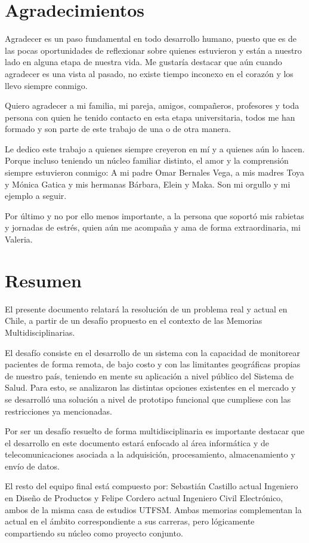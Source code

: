 \section*{Agradecimientos}

Agradecer es un paso fundamental en todo desarrollo humano, puesto que es de las pocas oportunidades de reflexionar sobre quienes estuvieron y están a nuestro lado en alguna etapa de nuestra vida. Me gustaría destacar que aún cuando agradecer es una vista al pasado, no existe tiempo inconexo en el corazón y los llevo siempre conmigo.

Quiero agradecer a mi familia, mi pareja, amigos, compañeros, profesores y toda persona con quien he tenido contacto en esta etapa universitaria, todos me han formado y son parte de este trabajo de una o de otra manera.

Le dedico este trabajo a quienes siempre creyeron en mí y a quienes aún lo hacen. Porque incluso teniendo un núcleo familiar distinto, el amor y la comprensión siempre estuvieron conmigo: A mi padre Omar Bernales Vega, a mis madres Toya y Mónica Gatica y mis hermanas Bárbara, Elein y Maka. Son mi orgullo y mi ejemplo a seguir.

Por último y no por ello menos importante, a la persona que soportó mis rabietas y jornadas de estrés, quien aún me acompaña y ama de forma extraordinaria, mi Valeria.

\newpage

\section*{Resumen}

El presente documento relatará la resolución de un problema real y actual en Chile, a partir de un desafío propuesto en el contexto de las Memorias Multidisciplinarias.\par
El desafío consiste en el desarrollo de un sistema con la capacidad de monitorear pacientes de forma remota, de bajo costo y con las limitantes geográficas propias de nuestro país, teniendo en mente su aplicación a nivel público del Sistema de Salud. Para esto, se analizaron las distintas opciones existentes en el mercado y se desarrolló una solución a nivel de prototipo funcional que cumpliese con las restricciones ya mencionadas.\par
Por ser un desafío resuelto de forma multidisciplinaria es importante destacar que el desarrollo en este documento estará enfocado al área informática y de telecomunicaciones asociada a la adquisición, procesamiento, almacenamiento y envío de datos.\par
El resto del equipo final está compuesto por: Sebastián Castillo actual Ingeniero en Diseño de Productos y Felipe Cordero actual Ingeniero Civil Electrónico, ambos de la misma casa de estudios UTFSM. Ambas memorias complementan la actual en el ámbito correspondiente a sus carreras, pero lógicamente compartiendo su núcleo como proyecto conjunto.
\newpage

